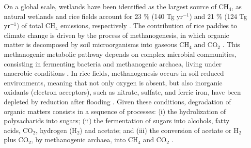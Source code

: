 On a global scale, wetlands have been identified as the largest source of CH$_{4}$, as natural wetlands and rice fields account for 23 \% (140 Tg yr$^{-1}$) and 21 \% (124 Tg yr$^{-1}$) of total CH$_{4}$ emissions, respectively \citep{chen2005}. The contribution of rice paddies to climate change is driven by the process of methanogenesis, in which organic matter is decomposed by soil microorganisms into gaseous CH$_{4}$ and CO$_{2}$ \citep{ponnamperuma1972, achtnich1995}. This methanogenic metabolic pathway depends on complex microbial communities, consisting in fermenting bacteria and methanogenic archaea, living under anaerobic conditions \citep{achtnich1995}. In rice fields, methanogenesis occurs in soil reduced environments, meaning that not only oxygen is absent, but also inorganic oxidants (electron acceptors), such as nitrate, sulfate, and ferric iron, have been depleted by reduction after flooding \citep{conrad2007}. Given these conditions, degradation of organic matters consists  in a sequence of processes: (i) the hydrolization of polysacharids into sugars; (ii) the fermentation of sugars into alcohols, fatty acids, CO$_{2}$, hydrogen (H$_{2}$) and acetate; and (iii) the conversion of acetate or H$_{2}$ plus CO$_{2}$, by methanogenic archaea, into CH$_{4}$ and CO$_{2}$ \citep{ferry1993ecology, conrad2007}.\\

